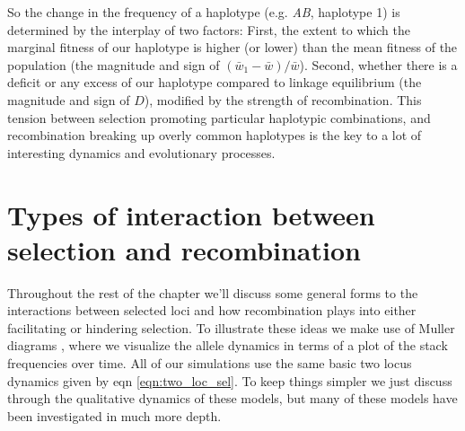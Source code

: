 So the change in the frequency of a haplotype (e.g. {\it AB}, haplotype 1) is determined by the interplay of two factors: First, the extent to which  the marginal fitness of our haplotype is higher (or lower) than the mean fitness of the population (the magnitude and sign of $(\bar{w}_1-\bar{w})/\bar{w}$). Second, whether there is a deficit or any excess of our haplotype compared to linkage equilibrium (the magnitude and sign of $D$), modified by the strength of recombination. This tension between selection promoting particular haplotypic combinations, and recombination breaking up overly common haplotypes is the key to a lot of interesting dynamics and evolutionary processes.

\section{Types of interaction between selection and recombination}
Throughout the rest of the chapter we'll discuss some general forms to the interactions between selected loci and how recombination plays into either facilitating or hindering selection. To illustrate these ideas we make use of Muller diagrams \citep{muller1932some}, where we visualize the allele dynamics in terms of a plot of the stack frequencies over time. All of our simulations use the same basic two locus dynamics given by eqn \eqref{eqn:two_loc_sel}. To keep things simpler we just discuss through the qualitative dynamics of these models, but many of these models have been investigated in much more depth.

